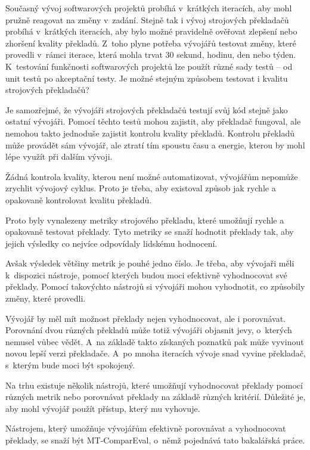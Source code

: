 Současný vývoj softwarových projektů probíhá v~krátkých iteracích,
  aby mohl pružně reagovat na změny v~zadání.
Stejně tak i vývoj strojových překladačů probíhá v~krátkých iteracích,
  aby bylo možné pravidelně ověřovat zlepšení nebo zhoršení kvality překladů.
Z~toho plyne potřeba vývojářů testovat změny,
  které provedli v~rámci iterace,
  která mohla trvat 30 sekund, hodinu, den nebo týden.
K~testování funkčnosti softwarových projektů lze použít různé sady testů -- od unit testů po akceptační testy.
Je možné stejným způsobem testovat i kvalitu strojových překladačů?

Je samozřejmé, 
  že vývojáři strojových překladačů testují svůj kód stejně jako ostatní vývojáři.
Pomocí těchto testů mohou zajistit,
  aby překladač fungoval,
  ale nemohou takto jednoduše zajistit kontrolu kvality překladů.
Kontrolu překladů může provádět sám vývojář,
  ale ztratí tím spoustu času a energie,
  kterou by mohl lépe využít při dalším vývoji.

Žádná kontrola kvality, kterou není možné automatizovat,
  vývojářům nepomůže zrychlit vývojový cyklus.
Proto je třeba,
  aby existoval způsob jak rychle a opakovaně kontrolovat kvalitu překladů.

Proto byly vynalezeny metriky strojového překladu,
  které umožňují rychle a opakovaně testovat překlady.
Tyto metriky se snaží hodnotit překlady tak,
  aby jejich výsledky co nejvíce odpovídaly lidskému hodnocení.

Avšak výsledek většiny metrik je pouhé jedno číslo.
Je třeba, aby vývojaři měli k~dispozici nástroje,
  pomocí kterých budou moci efektivně vyhodnocovat své překlady.
Pomocí takovýchto nástrojů si vývojáři mohou vyhodnotit,
  co způsobily změny, které provedli.

Vývojář by měl mít možnost překlady nejen vyhodnocovat,
  ale i porovnávat.
Porovnání dvou různých překladů může totiž vývojáři objasnit jevy,
  o~kterých nemusel vůbec vědět.
A~na základě takto získaných poznatků pak může vyvinout novou lepší verzi překladače.
A~po mnoha iteracích vývoje snad vyvine překladač,
  s~kterým bude moci být spokojený.

Na trhu existuje několik nástrojů,
  které umožňují vyhodnocovat překlady pomocí různých metrik
  nebo porovnávat překlady na základě různých kritérií.
Důležité je,
  aby mohl vývojář použít přístup,
  který mu vyhovuje.

Nástrojem,
  který umožňuje vývojářům efektivně porovnávat a vyhodnocovat překlady,
  se snaží být \mbox{MT-ComparEval}, 
  o~němž pojednává tato bakalářská práce.
